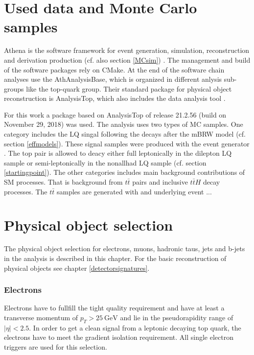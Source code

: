 \section{Used data and Monte Carlo samples}\label{MCsamples}
Athena is the {\ATLAS} software framework for event generation, simulation, reconstruction and derivation production (cf. also section \ref{MCsim}) \cite{Athena}. The management and build of the software packages rely on CMake. At the end of the software chain analyses use the AthAnalysisBase, which is organized in different anlysis sub-groups like the top-quark group. Their standard package for physical object reconstruction is AnalysisTop, which also includes the data analysis tool {\ROOT}.\par
For this work a package based on AnalysisTop of release 21.2.56 (build on November 29, 2018) was used.\newline
The analysis uses two types of MC samples. One category includes the LQ singal following the decays after the mBRW model (cf. section \ref{effmodels}). These signal samples were produced with the event generator {\aMCNLO} \cite{aMCNlo}. %
The top pair is allowed to deacy either full leptonically in the dilepton LQ sample or semi-leptonically in the nonallhad LQ sample (cf. section \ref{startingpoint}). The other categories includes main background contributions of SM processes. That is background from $t\bar{t}$ pairs and inclusive $t\bar{t}H$ decay processes. The $t\bar{t}$ samples are generated with {\POWHEG} and underlying event ... 
\section{Physical object selection}\label{physObj}
The physical object selection for electrons, muons, hadronic taus, jets and b-jets in the analysis is described in this chapter. For the basic reconstruction of physical objects see chapter \ref{detectorsignatures}.
\subsubsection*{Electrons}
Electrons have to fullfill the tight quality requirement and have at least a transverse momentum of $p_T>\SI{25}{\giga\electronvolt}$ and lie in the pseudorapidity range of $|\eta|<2.5$. In order to get a clean signal from a leptonic decaying top quark, the electrons have to meet the gradient isolation requirement. All single electron triggers are used for this selection.
